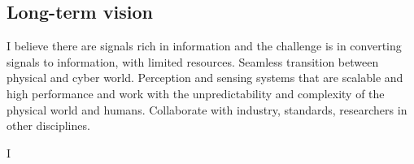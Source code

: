 \documentclass[10pt]{article}
\begin{document}
\subsection{Long-term vision}
I believe there are signals rich in information and the challenge is in converting signals to information, with limited resources. 
Seamless transition between physical and cyber world. 
Perception and sensing systems that are scalable and high performance and work with the unpredictability and complexity of the physical world and humans. Collaborate with industry, standards, researchers in other disciplines. 

I 



\end{document}
